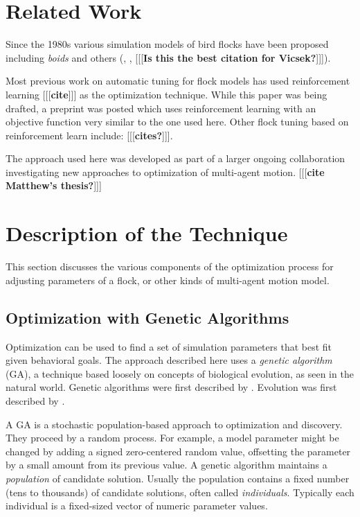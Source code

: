 \documentclass[letterpaper]{article}
\begin{document}

\section{Related Work}
\label{sec:related}

Since the 1980s various simulation models of bird flocks have been proposed including \textit{boids} \citep{reynolds_flocks_1987} and others (\citet{aoki_simulation_1982}, \citet{cucker_emergent_2007}, \citet{bhattacharya_collective_2010} [[[\textbf{Is this the best citation for Vicsek?}]]]).

Most previous work on automatic tuning for flock models has used reinforcement learning [[[\textbf{cite}]]] as the optimization technique. While this paper was being drafted, a preprint was posted \citep{brambati_learning_2025} which uses reinforcement learning with an objective function very similar to the one used here. Other flock tuning based on reinforcement learn include:
[[[\textbf{cites?}]]].


The approach used here was developed as part of a larger ongoing collaboration investigating new approaches to optimization of multi-agent motion. [[[\textbf{cite Matthew's thesis?}]]]

\section{Description of the Technique}
\label{sec:Description}

This section discusses the various components of the optimization process for adjusting parameters of a flock, or other kinds of multi-agent motion model.

\subsection{Optimization with Genetic Algorithms}
\label{subsec:Optimization_with_GA}

Optimization can be used to find a set of simulation parameters that best fit given behavioral goals. The approach described here uses a \textit{genetic algorithm} (GA), a technique based loosely on concepts of biological evolution, as seen in the natural world. Genetic algorithms were first described by \citet{holland_adaptation_1975}. Evolution was first described by \citet{darwin_origin_1859}.

A GA is a stochastic population-based approach to optimization and discovery. They proceed by a random process. For example, a model parameter might be changed by adding a signed zero-centered random value, offsetting the parameter by a small amount from its previous value. A genetic algorithm maintains a \textit{population} of candidate solution. Usually the population contains a fixed number (tens to thousands) of candidate solutions, often called \textit{individuals}. Typically each individual is a fixed-sized vector of numeric parameter values.
\end{document}
